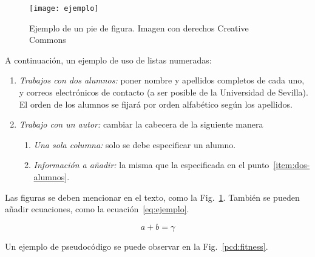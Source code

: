 \documentclass[conference,a4paper]{IEEEtran}
\def\figurename{Fig.}
\begin{document}
\begin{figure}
  \centering
  \texttt{[image: ejemplo]}
  \caption{Ejemplo de un pie de figura. Imagen con derechos Creative Commons}
  \label{fig:ejemplo}
\end{figure}

A continuación, un ejemplo de uso de listas numeradas:
\begin{enumerate}
\item\label{item:dos-alumnos} \textit{Trabajos con dos alumnos:} poner nombre y
  apellidos completos de cada uno, y correos electrónicos de contacto (a ser
  posible de la Universidad de Sevilla). El orden de los alumnos se fijará por
  orden alfabético según los apellidos.
\item \textit{Trabajo con un autor:} cambiar la cabecera de la siguiente manera
  \begin{enumerate}
  \item \textit{Una sola columna:} solo se debe especificar un alumno.
  \item \textit{Información a añadir:} la misma que la especificada en el
    punto~\ref{item:dos-alumnos}.
  \end{enumerate}
\end{enumerate}

Las figuras se deben mencionar en el texto, como la
\figurename~\ref{fig:ejemplo}. También se pueden añadir ecuaciones, como la
ecuación~\eqref{eq:ejemplo}.

\begin{equation}
  \label{eq:ejemplo}
  a + b = \gamma
\end{equation}

Un ejemplo de pseudocódigo se puede observar en la
\figurename~\ref{pcd:fitness}.
\end{document}
